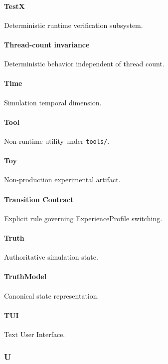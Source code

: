 \documentclass[9pt,a4paper,openany]{book}
\begin{document}
\paragraph{TestX}
Deterministic runtime verification subsystem.\allowbreak{}


\paragraph{Thread-count invariance}
Deterministic behavior independent of thread count.\allowbreak{}


\paragraph{Time}
Simulation temporal dimension.\allowbreak{}


\paragraph{Tool}
Non-\allowbreak{}runtime utility under \texttt{tools/\allowbreak{}}.\allowbreak{}


\paragraph{Toy}
Non-\allowbreak{}production experimental artifact.\allowbreak{}


\paragraph{Transition Contract}
Explicit rule governing ExperienceProfile switching.\allowbreak{}


\paragraph{Truth}
Authoritative simulation state.\allowbreak{}


\paragraph{TruthModel}
Canonical state representation.\allowbreak{}


\paragraph{TUI}
Text User Interface.\allowbreak{}


\subsubsection{U}
\end{document}
